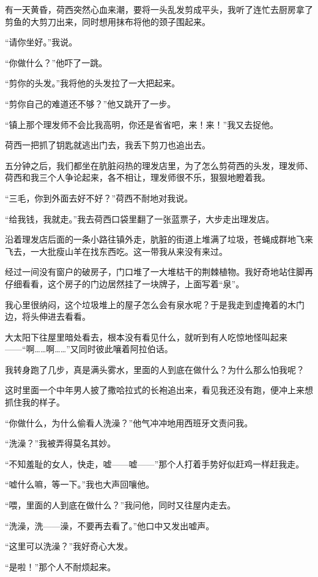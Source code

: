 \par 有一天黄昏，荷西突然心血来潮，要将一头乱发剪成平头，我听了连忙去厨房拿了剪鱼的大剪刀出来，同时想用抹布将他的颈子围起来。
\par “请你坐好。”我说。
\par “你做什么？”他吓了一跳。
\par “剪你的头发。”我将他的头发拉了一大把起来。
\par “剪你自己的难道还不够？”他又跳开了一步。
\par “镇上那个理发师不会比我高明，你还是省省吧，来！来！”我又去捉他。
\par 荷西一把抓了钥匙就逃出门去，我丢下剪刀也追出去。
\par 五分钟之后，我们都坐在肮脏闷热的理发店里，为了怎么剪荷西的头发，理发师、荷西和我三个人争论起来，各不相让，理发师很不乐，狠狠地瞪着我。
\par “三毛，你到外面去好不好？”荷西不耐地对我说。
\par “给我钱，我就走。”我去荷西口袋里翻了一张蓝票子，大步走出理发店。
\par 沿着理发店后面的一条小路往镇外走，肮脏的街道上堆满了垃圾，苍蝇成群地飞来飞去，一大批瘦山羊在找东西吃。这一带我从来没有来过。
\par 经过一间没有窗户的破房子，门口堆了一大堆枯干的荆棘植物。我好奇地站住脚再仔细看看，这个房子的门边居然挂了一块牌子，上面写着“泉”。
\par 我心里很纳闷，这个垃圾堆上的屋子怎么会有泉水呢？于是我走到虚掩着的木门边，将头伸进去看看。
\par 大太阳下往屋里暗处看去，根本没有看见什么，就听到有人吃惊地怪叫起来——“啊……啊……”又同时彼此嚷着阿拉伯话。
\par 我转身跑了几步，真是满头雾水，里面的人到底在做什么？为什么那么怕我呢？
\par 这时里面一个中年男人披了撒哈拉式的长袍追出来，看见我还没有跑，便冲上来想抓住我的样子。
\par “你做什么，为什么偷看人洗澡？”他气冲冲地用西班牙文责问我。
\par “洗澡？”我被弄得莫名其妙。
\par “不知羞耻的女人，快走，嘘——嘘——”那个人打着手势好似赶鸡一样赶我走。
\par “嘘什么嘛，等一下。”我也大声回嚷他。
\par “喂，里面的人到底在做什么？”我问他，同时又往屋内走去。
\par “洗澡，洗——澡，不要再去看了。”他口中又发出嘘声。
\par “这里可以洗澡？”我好奇心大发。
\par “是啦！”那个人不耐烦起来。
